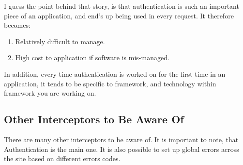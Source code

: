 I guess the point behind that story, is that authentication is such an 
important piece of an application, and end's up being used in every request. It
therefore becomes: 
\begin{enumerate}
  \item Relatively difficult to manage.
  \item High cost to application if software is mis-managed. 
\end{enumerate}

In addition, every time authentication is worked on for the first time in an 
application, it tends to be specific to framework, and technology within 
framework you are working on. 

\subsection{Other Interceptors to Be Aware Of}
There are many other interceptors to be aware of. It is important to note, that
Authentication is the main one. It is also possible to set up global errors 
across the site based on different errors codes.

